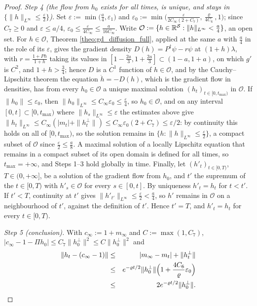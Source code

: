 \begin{proof}
\emph{Step 4 (the flow from $h_0$ exists for all times, is unique, and stays in $\{\|h\|_{L^\infty}\leq\frac\varepsilon2\}$).} Set $\varepsilon:=\min\bigl(\tfrac a4,\varepsilon_1\bigr)$ and $\varepsilon_0:=\min\bigl(\tfrac\varepsilon{2C_\infty(2+C_7)},\tfrac\varrho{4C_6},1\bigr)$; since $C_7\geq0$ and $\varepsilon\leq a/4$, $\varepsilon_0\leq\frac\varepsilon{4C_\infty}\leq\frac a{16C_\infty}$. Write $\mathcal O:=\{h\in\mathbb R^{\mathcal S}:\|h\|_{L^\infty}<\frac a4\}$, an open set. For $h\in\mathcal O$, Theorem \ref{theo:gd_diffusion_full}, applied at the same $a$ with $\frac a4$ in the role of its $\varepsilon$, gives the gradient density $D(h)=P^\dagger\psi-r\psi$ at $(1+h)\lambda$, with $r=\frac{1+Ph}{1+h}$ taking its values in $[1-\frac{2a}3,1+\frac{2a}3]\subset(1-a,1+a)$, on which $g'$ is $C^2$, and $1+h>\frac34$; hence $D$ is a $C^1$ function of $h\in\mathcal O$, and by the Cauchy--Lipschitz theorem the equation $\dot h=-D(h)$, which is the gradient flow in densities, has from every $h_0\in\mathcal O$ a unique maximal solution $(h_t)_{t\in[0,t_{\max})}$ in $\mathcal O$. If $\|h_0\|\leq\varepsilon_0$, then $\|h_0\|_{L^\infty}\leq C_\infty\varepsilon_0\leq\frac\varepsilon4$, so $h_0\in\mathcal O$, and on any interval $[0,t]\subset[0,t_{\max})$ where $\|h_s\|_{L^\infty}\leq\varepsilon$ the estimates above give $\|h_t\|_{L^\infty}\leq C_\infty(|m_t|+\|h_t^\perp\|)\leq C_\infty\varepsilon_0(2+C_7)\leq\varepsilon/2$: by continuity this holds on all of $[0,t_{\max})$, so the solution remains in $\{h:\|h\|_{L^\infty}\leq\frac\varepsilon2\}$, a compact subset of $\mathcal O$ since $\frac\varepsilon2\leq\frac a8$. A maximal solution of a locally Lipschitz equation that remains in a compact subset of its open domain is defined for all times, so $t_{\max}=+\infty$, and Steps 1--3 hold globally in time. Finally, let $(h'_t)_{t\in[0,T)}$, $T\in(0,+\infty]$, be a solution of the gradient flow from $h_0$, and $t'$ the supremum of the $t\in[0,T)$ with $h'_s\in\mathcal O$ for every $s\in[0,t]$. By uniqueness $h'_t=h_t$ for $t<t'$. If $t'<T$, continuity at $t'$ gives $\|h'_{t'}\|_{L^\infty}\leq\frac\varepsilon2<\frac a4$, so $h'$ remains in $\mathcal O$ on a neighbourhood of $t'$, against the definition of $t'$. Hence $t'=T$, and $h'_t=h_t$ for every $t\in[0,T)$.

\emph{Step 5 (conclusion).} With $c_\infty:=1+m_\infty$ and $C:=\max(1,C_7)$, $|c_\infty-1-\Pi h_0|\leq C_7\|h_0^\perp\|^2\leq C\|h_0^\perp\|^2$ and
\begin{eqnarray*}
    \|h_t-(c_\infty-1)\|&\leq&|m_\infty-m_t|+\|h_t^\perp\|\\
    &\leq& e^{-\varrho t/2}\|h_0^\perp\|\Bigl(1+\frac{4C_6}\varrho\varepsilon_0\Bigr)\\
    &\leq&2e^{-\varrho t/2}\|h_0^\perp\|.
\end{eqnarray*}


\end{proof}
